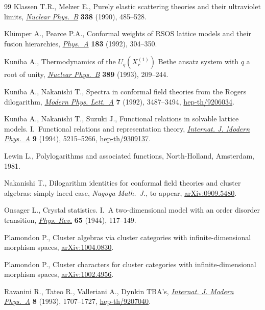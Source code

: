 \documentclass[pdftex]{sigma}
\numberwithin{equation}{section}
\theoremstyle{definition}
\begin{document}
\begin{thebibliography}{99}
Klassen T.R., Melzer E.,
Purely elastic scattering theories and their ultraviolet limits,
\href{http://dx.doi.org/10.1016/0550-3213(90)90643-R}{{\em Nuclear Phys.~B}} {\bf 338} (1990), 485--528.

Kl\"umper A., Pearce P.A.,
Conformal weights of RSOS lattice models and their fusion hierarchies,
\href{http://dx.doi.org/10.1016/0378-4371(92)90149-K}{{\em Phys.~A}} {\bf 183} (1992), 304--350.

Kuniba A.,
Thermodynamics of the {$U_q(X^{(1)}_r)$} Bethe ansatz system with $q$ a root of unity,
\href{http://dx.doi.org/10.1016/0550-3213(93)90291-V}{{\em Nuclear Phys.~B}} {\bf 389} (1993), 209--244.

Kuniba A., Nakanishi T.,
Spectra in conformal f\/ield theories from the Rogers dilogarithm,
\href{http://dx.doi.org/10.1142/S0217732392002895}{{\em Modern Phys. Lett.~A}} {\bf 7} (1992), 3487--3494,
\href{http://arxiv.org/abs/hep-th/9206034}{hep-th/9206034}.

Kuniba A., Nakanishi T., Suzuki J.,
Functional relations in solvable lattice models. I.~Functional relations and representation theory,
\href{http://dx.doi.org/10.1142/S0217751X94002119}{{\em Internat. J. Modern Phys.~A}} {\bf 9} (1994), 5215--5266,
\href{http://arxiv.org/abs/hep-th/9309137}{hep-th/9309137}.

Lewin L.,
Polylogarithms and associated functions,
North-Holland, Amsterdam, 1981.

Nakanishi T.,
Dilogarithm identities for conformal f\/ield theories and cluster  algebras: simply laced case,
{\it Nagoya Math.~J.}, to appear,
\href{http://arxiv.org/abs/0909.5480}{arXiv:0909.5480}.

Onsager L.,
Crystal statistics. I.~A two-dimensional model with an order disorder transition,
\href{http://dx.doi.org/10.1103/PhysRev.65.117}{{\em Phys. Rev.}} {\bf 65} (1944), 117--149.

Plamondon P.,
Cluster algebras via cluster categories with inf\/inite-dimensional morphism spaces,
\href{http://arxiv.org/abs/1004.0830}{arXiv:1004.0830}.

Plamondon P.,
Cluster characters for cluster categories with inf\/inite-dimensional morphism spaces,
\href{http://arxiv.org/abs/1002.4956}{arXiv:1002.4956}.

Ravanini R., Tateo R., Valleriani A.,
Dynkin TBA's,
\href{http://dx.doi.org/10.1142/S0217751X93000709}{{\em Internat. J. Modern Phys.~A}} {\bf 8} (1993), 1707--1727,
\href{http://arxiv.org/abs/hep-th/9207040}{hep-th/9207040}.


\end{thebibliography}
\end{document}
